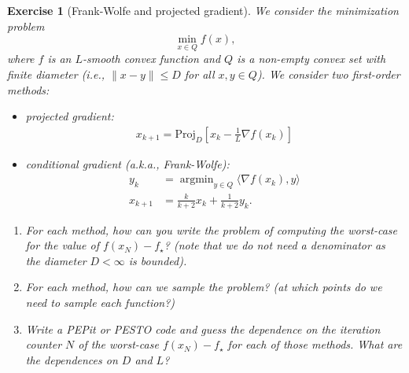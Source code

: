 \documentclass[11pt,a4paper]{article}
\newcommand{\inner}[2]{{\langle #1, #2\rangle}}
\DeclareMathOperator*{\argmin}{argmin}
\newcommand{\pesto}{{PESTO }}
\newcommand{\pepit}{{PEPit }}
\newtheorem{exercise}{Exercise}
\begin{document}
	\begin{exercise}[Frank-Wolfe and projected gradient]\label{ex:FW}
	We consider the minimization problem
	\[ \min_{x\in Q} f(x), \]
	where $f$ is an $L$-smooth convex function and $Q$ is a non-empty convex set with finite diameter (i.e., $\|x-y\|\leqslant D$ for all $x,y\in Q$). We consider two first-order methods:
	\begin{itemize}
	\item projected gradient:
	\begin{equation*}
	\begin{aligned}
	x_{k+1}=\mathrm{Proj}_D\left[x_{k}-\tfrac{1}{L}\nabla f(x_k)\right]
	\end{aligned}
	\end{equation*}
	\item conditional gradient (a.k.a., Frank-Wolfe):
	\begin{equation*}
	\begin{aligned}
	y_k &= \argmin_{y\in Q} \inner{\nabla f(x_k)}{y}\\
	x_{k+1} &= \tfrac{k}{k+2} x_k + \tfrac{1}{k+2} y_k.
	\end{aligned}
	\end{equation*}
	\end{itemize}
	
	\begin{enumerate}
	\item For each method, how can you write the problem of computing the worst-case for the value of $f(x_N)-f_\star$? (note that we do not need a denominator as the diameter $D<\infty$ is bounded).
	\item For each method, how can we sample the problem? (at which points do we need to sample each function?)
	\item Write a \pepit or \pesto code and guess the dependence on the iteration counter $N$ of the worst-case $f(x_N)-f_\star$ for each of those methods. What are the dependences on $D$ and $L$?
	\end{enumerate}
	\end{exercise}	
	
\end{document}
